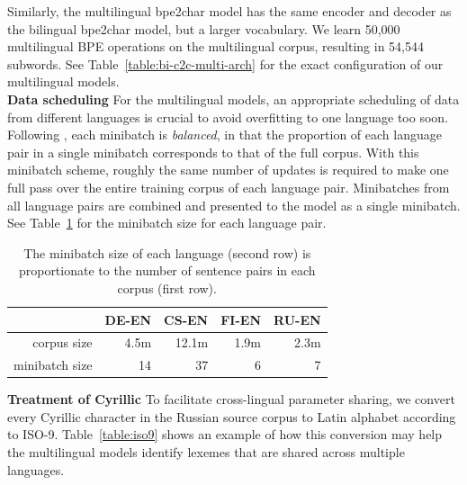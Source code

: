 \documentclass[11pt,letterpaper]{article}
\newcommand{\ti}{\textit}
\newcommand{\tb}{\textbf}
\begin{document}
    Similarly, the multilingual bpe2char model has the same encoder and decoder as the bilingual bpe2char model, but a larger vocabulary. We learn 50,000 multilingual BPE operations on the multilingual corpus, resulting in 54,544 subwords. See Table~\ref{table:bi-c2c-multi-arch} for the exact configuration of our multilingual models. \\

    \noindent\tb{Data scheduling} For the multilingual models, an appropriate scheduling of data from different languages is crucial to avoid overfitting to one language too soon. Following \cite{Firat:16,Firat:16b}, each minibatch is \ti{balanced}, in that the proportion of each language pair in a single minibatch corresponds to that of the full corpus. With this minibatch scheme, roughly the same number of updates is required to make one full pass over the entire training corpus of each language pair. Minibatches from all language pairs are combined and presented to the model as a single minibatch. See Table~\ref{table:corpus-stats} for the minibatch size for each language pair.

        \begin{table}[h]
        \footnotesize
        \begin{center}
        \begin{tabular}{ r | r | r | r | r } 
            \multicolumn{1}{c}{} & \multicolumn{1}{r}{DE-EN} & \multicolumn{1}{r}{CS-EN} & \multicolumn{1}{r}{FI-EN} & \multicolumn{1}{r}{RU-EN} \\ \hline \hline
            corpus size    & 4.5m & 12.1m & 1.9m & 2.3m \\
            minibatch size & 14 & 37 & 6 & 7 \\ \hline
        \end{tabular}
        \caption{The minibatch size of each language (second row) is proportionate to the number of sentence pairs in each corpus (first row).}
        \label{table:corpus-stats}
        \end{center}
        \normalsize
        \end{table}

    \noindent\tb{Treatment of Cyrillic} To facilitate cross-lingual parameter sharing, we convert every Cyrillic character in the Russian source corpus to Latin alphabet according to ISO-9. Table~\ref{table:iso9} shows an example of how this conversion may help the multilingual models identify lexemes that are shared across multiple languages.
\end{document}
